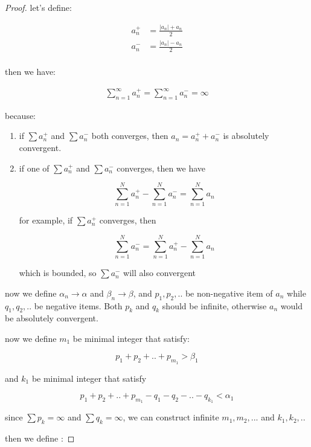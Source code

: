 \begin{proof}
    let's define:

    \begin{align*}
        a_n^{+} &= \frac{|a_n| + a_n}{2} \\
        a_n^{-} &= \frac{|a_n| - a_n}{2} \\
    \end{align*}

    then we have:

    \begin{align*}
        \sum_{n=1}^{\infty}a_n^{+} = \sum_{n=1}^{\infty}a_n^{-} = \infty
    \end{align*}

    because:

    \begin{enumerate}
        \item if $\sum a_n^+$ and $\sum a_n^{-}$ both converges, then $a_n = a_n^+ + a_n^-$ is absolutely convergent.

        \item if one of $\sum a_n^+$ and $\sum a_n^{-}$ converges, then we have

        \[
            \sum_{n=1}^{N}a_n^+ -\sum_{n=1}^{N}a_n^- = \sum_{n=1}^{N}a_n
        \]

        for example, if $\sum a_n^+$ converges, then 

        \[
        \sum_{n=1}^{N}a_n^- =\sum_{n=1}^{N}a_n^+ - \sum_{n=1}^{N}a_n
        \]

        which is bounded, so $\sum a_n^-$ will also convergent
    \end{enumerate}

    now we define $\alpha_n \to \alpha$ and $\beta_n \to \beta$, and $p_1, p_2, ..$ be non-negative item of $a_n$ while $q_1, q_2, .. $
    be negative items. Both $p_k$ and $q_k$ should be infinite, otherwise $a_n$ would be absolutely convergent.

    now we define $m_1$ be minimal integer that satisfy:

    \[
        p_1 + p_2 + .. + p_{m_1} > \beta_1
    \]

    and $k_1$ be minimal integer that satisfy

    \[
        p_1 + p_2 + .. + p_{m_1} - q_1 -q_2 - .. -q_{k_1} < \alpha_1
    \]

    since $\sum p_k = \infty$ and $\sum q_k = \infty$, we can construct infinite $m_1,m_2, ...$ and $k_1,k_2, ..$

    then we define :


\end{proof}
